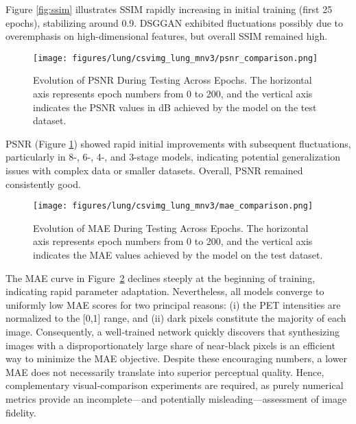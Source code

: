 \documentclass[a4paper, times, 10pt,twocolumn]{article}
\begin{document}
Figure \ref{fig:ssim} illustrates SSIM rapidly increasing in initial training (first 25 epochs), stabilizing around 0.9. DSGGAN exhibited fluctuations possibly due to overemphasis on high-dimensional features, but overall SSIM remained high.

\begin{figure}[h]
	\centering
	\texttt{[image: figures/lung/csvimg\_lung\_mnv3/psnr\_comparison.png]}
	\caption[psnr]{Evolution of PSNR During Testing Across Epochs. The horizontal axis represents epoch numbers from 0 to 200, and the vertical axis indicates the PSNR values in dB achieved by the model on the test dataset.}
	\label{fig:psnr}
\end{figure}

PSNR (Figure \ref{fig:psnr}) showed rapid initial improvements with subsequent fluctuations, particularly in 8-, 6-, 4-, and 3-stage models, indicating potential generalization issues with complex data or smaller datasets. Overall, PSNR remained consistently good.

\begin{figure}[h]
	\centering
	\texttt{[image: figures/lung/csvimg\_lung\_mnv3/mae\_comparison.png]}
	\caption[mae]{Evolution of MAE During Testing Across Epochs. The horizontal axis represents epoch numbers from 0 to 200, and the vertical axis indicates the MAE values achieved by the model on the test dataset.}
	\label{fig:mae}
\end{figure}

The MAE curve in Figure \ref{fig:mae} declines steeply at the beginning of training, indicating rapid parameter adaptation. Nevertheless, all models converge to uniformly low MAE scores for two principal reasons: (i) the PET intensities are normalized to the [0,1] range, and (ii) dark pixels constitute the majority of each image. Consequently, a well‑trained network quickly discovers that synthesizing images with a disproportionately large share of near‑black pixels is an efficient way to minimize the MAE objective.
Despite these encouraging numbers, a lower MAE does not necessarily translate into superior perceptual quality. Hence, complementary visual‑comparison experiments are required, as purely numerical metrics provide an incomplete—and potentially misleading—assessment of image fidelity.
\end{document}
